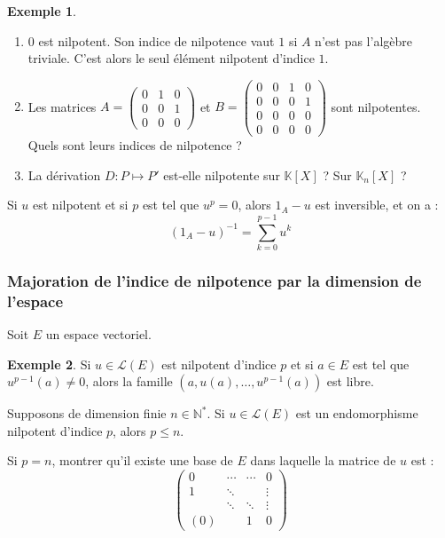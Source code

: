 \documentclass[french]{article}
\newcommand{\N}{\mathbb{N}}
\newcommand{\K}{\mathbb{K}}
\newcommand{\st}{^*}
\newcommand{\inv}{^{-1}}
\theoremstyle{plain}
\theoremstyle{definition}
\newtheorem*{ex}{Exemple}
\theoremstyle{remark}
\begin{document}
\begin{ex}
	\begin{enumerate}
		\item $0$ est nilpotent. Son indice de nilpotence vaut $1$ si $A$ n'est pas l'algèbre triviale. C'est alors le seul élément nilpotent d'indice $1$.
		\item Les matrices $A=\displaystyle\begin{pmatrix}
			0&1&0\\
			0&0&1\\
			0&0&0
		\end{pmatrix}$ et $B=\displaystyle\begin{pmatrix}
		0&0&1&0\\
		0&0&0&1\\
		0&0&0&0\\
		0&0&0&0
		\end{pmatrix}$ sont nilpotentes. Quels sont leurs indices de nilpotence ?
		\item La dérivation $D:P\mapsto P'$ est-elle nilpotente sur $\K[X]$ ? Sur $\K_n[X]$ ?
	\end{enumerate}
\end{ex}

\begin{prop}[HP]%
	Si $u$ est nilpotent et si $p$ est tel que $u^p=0$, alors $1_A-u$ est inversible, et on a : $$(1_A-u)\inv=\sum_{k=0}^{p-1}u^k$$
\end{prop}

\subsubsection*{Majoration de l'indice de nilpotence par la dimension de l'espace}

Soit $E$ un espace vectoriel.

\begin{ex}
	Si $u\in\mathcal{L}(E)$ est nilpotent d'indice $p$ et si $a\in E$ est tel que $u^{p-1}(a)\ne 0$, alors la famille $(a,u(a),\ldots,u^{p-1}(a))$ est libre.
\end{ex}

\begin{prop}%
	Supposons de dimension finie $n\in\N\st$. Si $u\in\mathcal{L}(E)$ est un endomorphisme nilpotent d'indice $p$, alors $p\leqslant n$.
\end{prop}

\begin{exo}
	Si $p=n$, montrer qu'il existe une base de $E$ dans laquelle la matrice de $u$ est : $$\begin{pmatrix}
		0&\cdots&\cdots&0\\
		1&\ddots&&\vdots\\
		&\ddots&\ddots&\vdots\\
		(0)&&1&0
	\end{pmatrix}$$
\end{exo}
\end{document}
